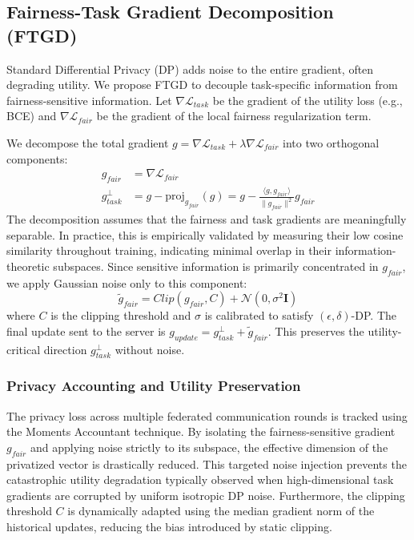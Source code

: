 \subsection{Fairness-Task Gradient Decomposition (FTGD)}
Standard Differential Privacy (DP) adds noise to the entire gradient, often degrading utility. We propose FTGD to decouple task-specific information from fairness-sensitive information. Let $\nabla \mathcal{L}_{task}$ be the gradient of the utility loss (e.g., BCE) and $\nabla \mathcal{L}_{fair}$ be the gradient of the local fairness regularization term.

We decompose the total gradient $g = \nabla \mathcal{L}_{task} + \lambda \nabla \mathcal{L}_{fair}$ into two orthogonal components:
\begin{align}
g_{fair} &= \nabla \mathcal{L}_{fair} \\
g_{task}^{\perp} &= g - \text{proj}_{g_{fair}}(g) = g - \frac{\langle g, g_{fair} \rangle}{\|g_{fair}\|^2} g_{fair}
\end{align}
The decomposition assumes that the fairness and task gradients are meaningfully separable. In practice, this is empirically validated by measuring their low cosine similarity throughout training, indicating minimal overlap in their information-theoretic subspaces. Since sensitive information is primarily concentrated in $g_{fair}$, we apply Gaussian noise only to this component:
\begin{equation}
\tilde{g}_{fair} = Clip(g_{fair}, C) + \mathcal{N}(0, \sigma^2 \mathbf{I})
\end{equation}
where $C$ is the clipping threshold and $\sigma$ is calibrated to satisfy $(\epsilon, \delta)$-DP. The final update sent to the server is $g_{update} = g_{task}^{\perp} + \tilde{g}_{fair}$. This preserves the utility-critical direction $g_{task}^{\perp}$ without noise.

\subsubsection*{Privacy Accounting and Utility Preservation}
The privacy loss across multiple federated communication rounds is tracked using the Moments Accountant technique. By isolating the fairness-sensitive gradient $g_{fair}$ and applying noise strictly to its subspace, the effective dimension of the privatized vector is drastically reduced. This targeted noise injection prevents the catastrophic utility degradation typically observed when high-dimensional task gradients are corrupted by uniform isotropic DP noise. Furthermore, the clipping threshold $C$ is dynamically adapted using the median gradient norm of the historical updates, reducing the bias introduced by static clipping.

